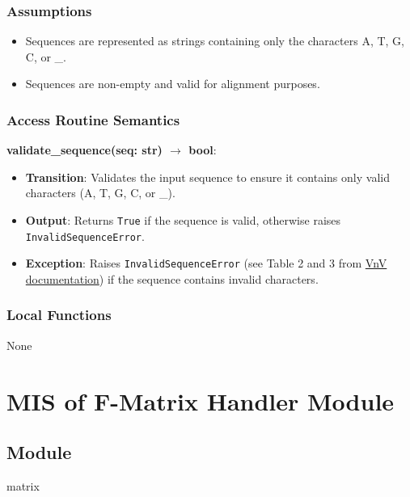 \documentclass[12pt, titlepage]{article}
\begin{document}
\subsubsection{Assumptions}

\begin{itemize}
    \item Sequences are represented as strings containing only the characters A, T, G, C, or \_.
    \item Sequences are non-empty and valid for alignment purposes.
\end{itemize}

\subsubsection{Access Routine Semantics}

\noindent \textbf{validate\_sequence(seq: str) $\rightarrow$ bool}:
\begin{itemize}
    \item \textbf{Transition}: Validates the input sequence to ensure it contains only valid characters (A, T, G, C, or \_).
    \item \textbf{Output}: Returns \texttt{True} if the sequence is valid, otherwise raises \texttt{InvalidSequenceError}.
    \item \textbf{Exception}: Raises \texttt{InvalidSequenceError} (see Table 2 and 3 from \href{https://github.com/UGarCil/UGarcil_capstone/blob/main/docs/VnVPlan/VnVPlan.pdf}{VnV documentation}) if the sequence contains invalid characters.
\end{itemize}

\subsubsection{Local Functions}

None

\newpage
\section{MIS of F-Matrix Handler Module} \label{mFIM}

\subsection{Module}

matrix
\end{document}
